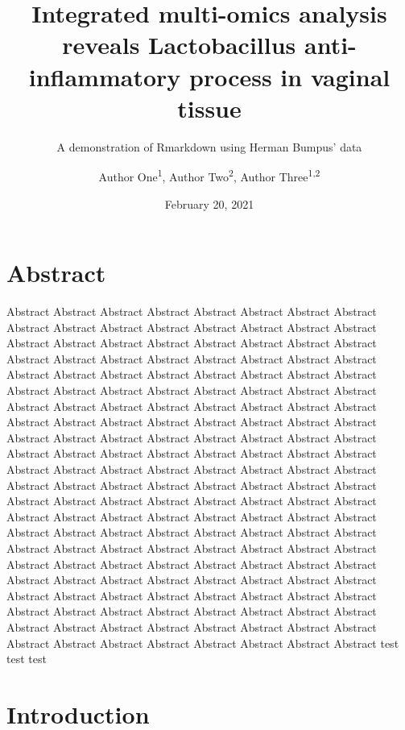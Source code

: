 \documentclass[
]{article}
\title{Integrated multi-omics analysis reveals Lactobacillus anti-inflammatory process in vaginal tissue}
\subtitle{A demonstration of Rmarkdown using Herman Bumpus' data}
\author{Author One\textsuperscript{1},
Author Two\textsuperscript{2},
Author Three\textsuperscript{1,2}}
\date{February 20, 2021}
\begin{document}
\maketitle


\hypertarget{abstract}{%
\section{Abstract}\label{abstract}}

Abstract Abstract Abstract Abstract Abstract Abstract Abstract Abstract Abstract Abstract Abstract Abstract Abstract Abstract Abstract Abstract Abstract Abstract Abstract Abstract Abstract Abstract Abstract Abstract Abstract Abstract Abstract Abstract Abstract Abstract Abstract Abstract Abstract Abstract Abstract Abstract Abstract Abstract Abstract Abstract Abstract Abstract Abstract Abstract Abstract Abstract Abstract Abstract Abstract Abstract Abstract Abstract Abstract Abstract Abstract Abstract Abstract Abstract Abstract Abstract Abstract Abstract Abstract Abstract Abstract Abstract Abstract Abstract Abstract Abstract Abstract Abstract Abstract Abstract Abstract Abstract Abstract Abstract Abstract Abstract Abstract Abstract Abstract Abstract Abstract Abstract Abstract Abstract Abstract Abstract Abstract Abstract Abstract Abstract Abstract Abstract Abstract Abstract Abstract Abstract Abstract Abstract Abstract Abstract Abstract Abstract Abstract Abstract Abstract Abstract Abstract Abstract Abstract Abstract Abstract Abstract Abstract Abstract Abstract Abstract Abstract Abstract Abstract Abstract Abstract Abstract Abstract Abstract Abstract Abstract Abstract Abstract Abstract Abstract Abstract Abstract Abstract Abstract Abstract Abstract Abstract Abstract Abstract Abstract Abstract Abstract Abstract Abstract Abstract Abstract Abstract Abstract Abstract Abstract Abstract Abstract Abstract Abstract Abstract Abstract Abstract Abstract Abstract Abstract Abstract Abstract Abstract Abstract Abstract Abstract Abstract Abstract Abstract Abstract Abstract Abstract
test test test

\clearpage

\hypertarget{introduction}{%
\section{Introduction}\label{introduction}}
\end{document}
